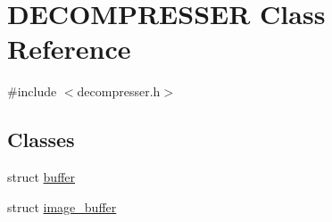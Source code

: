 \hypertarget{class_d_e_c_o_m_p_r_e_s_s_e_r}{\section{D\-E\-C\-O\-M\-P\-R\-E\-S\-S\-E\-R Class Reference}
\label{class_d_e_c_o_m_p_r_e_s_s_e_r}
}


{\ttfamily \#include $<$decompresser.\-h$>$}

\subsection*{Classes}
\begin{DoxyCompactItemize}
\item 
struct \hyperlink{struct_d_e_c_o_m_p_r_e_s_s_e_r_1_1buffer}{buffer}
\item 
struct \hyperlink{struct_d_e_c_o_m_p_r_e_s_s_e_r_1_1image__buffer}{image\-\_\-buffer}
\end{DoxyCompactItemize}
